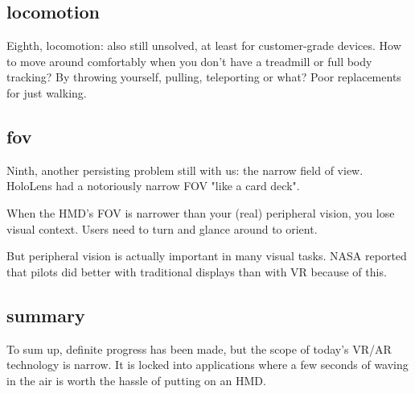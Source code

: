 \subsection{locomotion}
Eighth, locomotion: also still unsolved, at least for customer-grade devices. How to move around comfortably when you don't have a treadmill or full body tracking? By throwing yourself, pulling, teleporting or what? Poor replacements for just walking.



\subsection{fov}
Ninth, another persisting problem still with us: the narrow field of view. HoloLens had a notoriously narrow FOV "like a card deck". 

When the HMD's FOV is narrower than your (real) peripheral vision, you lose visual context. Users need to turn and glance around to orient. 

But peripheral vision is actually important in many visual tasks. NASA reported that pilots did better with traditional displays than with VR because of this. 


\subsection{summary}
To sum up, definite progress has been made, but the scope of today's VR/AR technology is narrow. It is locked into applications where a few seconds of waving in the air is worth the hassle of putting on an HMD.


